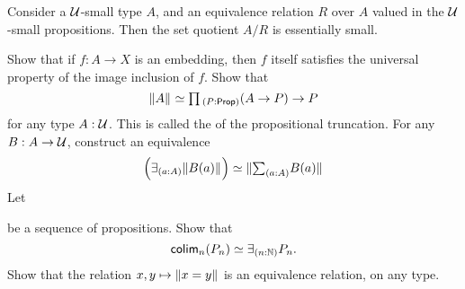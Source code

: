 \begin{cor}
  Consider a $\mathcal{U}$-small type $A$, and an equivalence relation $R$ over $A$ valued in the $\mathcal{U}$-small propositions. Then the set quotient $A/R$ is essentially small.
\end{cor}

\begin{exercises}
  \exercise Show that if $f:A\to X$ is an embedding, then $f$ itself satisfies the universal property of the image inclusion of $f$.
  \exercise Show that
  \begin{equation*}
    \eqv{\brck{A}}{\prd{P:\prop}(A\to P)\to P}
  \end{equation*}
  for any type $A:\mathcal{U}$. This is called the  of the propositional truncation.
  \exercise For any $B:A\to\mathcal{U}$, construct an equivalence
  \begin{equation*}
    \eqv{\Big(\exists_{(a:A)}\brck{B(a)}\Big)}{\brck{\sm{a:A}B(a)}}
  \end{equation*}
  \exercise Let
  be a sequence of propositions. Show that
  \begin{equation*}
    \eqv{\colim_n(P_n)}{\exists_{(n:\N)} P_n}.
  \end{equation*}
  \exercise Show that the relation $x,y\mapsto\Vert x=y\Vert_{}$ is an equivalence relation, on any type.

\end{exercises}
